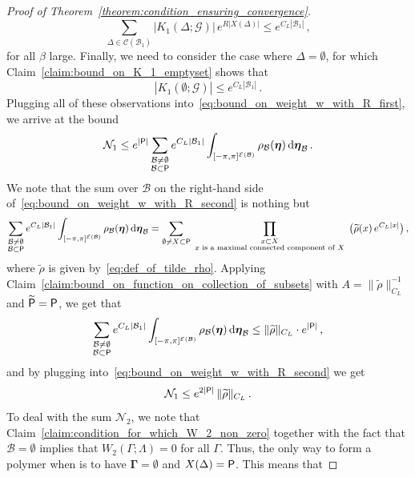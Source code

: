 \documentclass[11pt]{article}
\theoremstyle{definition}
\theoremstyle{remark}
\numberwithin{theorem}{section}
\def\La{{\Lambda}}
\def\Ga{{\Gamma}}
\newcommand{\cE}{\mathcal{E}}
\newcommand{\cB}{\mathcal B}
\begin{document}
\begin{proof}[Proof of Theorem~\ref{theorem:condition_ensuring_convergence}]
    \[
       \sum_{\Delta\in \mathcal{C}(\mathcal{B}_1 ) } |K_1(\Delta;\mathcal{G})| \,  e^{R|X(\Delta)|} \le e^{C_L|\mathcal{B}_1|} \, , 
    \]  
    for all $\beta$ large. Finally, we need to consider the case where $\Delta = \emptyset$, for which Claim~\ref{claim:bound_on_K_1_emptyset} shows that
    \[
    |K_1(\emptyset;\mathcal{G})| \le e^{C_L |\mathcal{B}_1|} \, . 
    \]
    Plugging all of these observations into~\eqref{eq:bound_on_weight_w_with_R_first}, we arrive at the bound 
    \begin{equation} \label{eq:bound_on_weight_w_with_R_second}
        \mathcal{N}_1 \le  e^{|{\sf P}|} \sum_{\substack{\mathcal{B}\not=\emptyset \\  \cB  \subset {\sf P} }} e^{C_L|\mathcal{B}_1|} \int_{[-\pi,\pi]^{\cE(\mathcal{B})}} \rho_{\mathcal{B}}(\boldsymbol{\eta}) \,  {\rm d}\boldsymbol{\eta}_{\mathcal{B}} \, .
    \end{equation}
    We note that the sum over $\mathcal{B}$ on the right-hand side of~\eqref{eq:bound_on_weight_w_with_R_second} is nothing but
    \[
    \sum_{\substack{\mathcal{B}\not=\emptyset \\  \cB  \subset {\sf P} }} e^{C_L|\mathcal{B}_1|} \int_{[-\pi,\pi]^{\cE(\mathcal{B})}} \rho_{\mathcal{B}}(\boldsymbol{\eta}) \,  {\rm d}\boldsymbol{\eta}_{\mathcal{B}}  = \sum_{\emptyset \not= X\subset {\sf P} } \prod_{\substack{ x \subset X \\ \text{ $x$ is a maximal connected component of $X$ }}} \big( \widetilde{\rho}(x) \, e^{C_L|x|}\big) \, ,
    \]
    where $\widetilde{\rho}$ is given by~\eqref{eq:def_of_tilde_rho}. Applying Claim~\ref{claim:bound_on_function_on_collection_of_subsets} with $A = \| \widetilde{\rho} \|_{C_L}^{-1}$ and $\widetilde{\sf P} = {\sf P}$, we get that 
    \[
    \sum_{\substack{\mathcal{B}\not=\emptyset \\  \cB  \subset {\sf P} }} e^{C_L|\mathcal{B}_1|} \int_{[-\pi,\pi]^{\cE(\mathcal{B})}} \rho_{\mathcal{B}}(\boldsymbol{\eta}) \,  {\rm d}\boldsymbol{\eta}_{\mathcal{B}}  \le \| \widetilde \rho \|_{C_L} \cdot e^{|{\sf P}|} \, ,
    \]
    and by plugging into~\eqref{eq:bound_on_weight_w_with_R_second} we get
    \begin{equation}\label{eq:bound_on_N_1}
        \mathcal{N}_1 \le e^{2|{\sf P}|}  \, \| \widetilde \rho \|_{C_L} \, .
    \end{equation}
    To deal with the sum $\mathcal{N}_2$, we note that Claim~\ref{claim:condition_for_which_W_2_non_zero} together with the fact that $\cB = \emptyset$ implies that $W_2(\Ga;\La) = 0$ for all $\Ga$. Thus, the only way to form a polymer when is to have $\boldsymbol{\Ga} = \emptyset$ and $X(\Delta) = {\sf P}$. This means that 

\end{proof}
\end{document}
